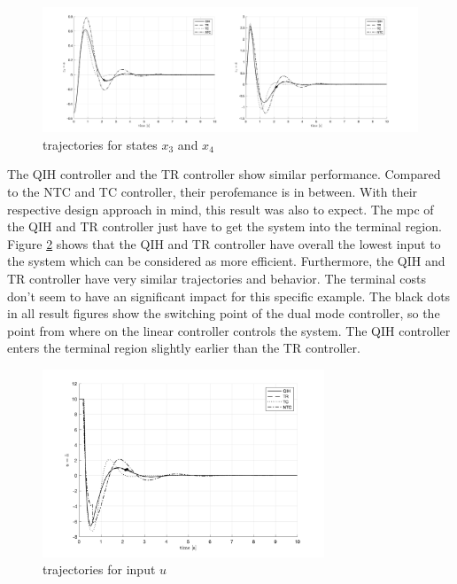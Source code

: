 \documentclass[10pt,a4paper,titlepage]{article}
\begin{document}
\begin{figure}[h!]
	\begin{center}
		\includegraphics[width=\textwidth]{img/bb_time_x3x4.png}
		\caption{trajectories for states $x_3$ and $x_4$}
		\label{pic:bb_time_x3x4}
	\end{center}
\end{figure}

The QIH controller and the TR controller show similar performance. Compared to the NTC and TC controller, their perofemance is in between. With their respective 
design approach in mind, this result was also to expect. The \gls{mpc} of the QIH and TR controller just have to get the system into the terminal region.
Figure \ref{pic:bb_time_u} shows that the QIH and TR controller have overall the lowest input to the system which can be considered as more efficient. 
Furthermore, the QIH and TR controller have very similar
trajectories and behavior. The terminal costs don't seem to have an significant impact for this specific example. The black dots in all result figures show the
switching point of the dual mode controller, so the point from where on the linear controller controls the system. The QIH controller enters the terminal region
slightly earlier than the TR controller. 

\begin{figure}[h!]
	\begin{center}
		\includegraphics[width=0.75\textwidth]{img/bb_time_u.png}
		\caption{trajectories for input $u$}
		\label{pic:bb_time_u}
	\end{center}
\end{figure}
\end{document}
